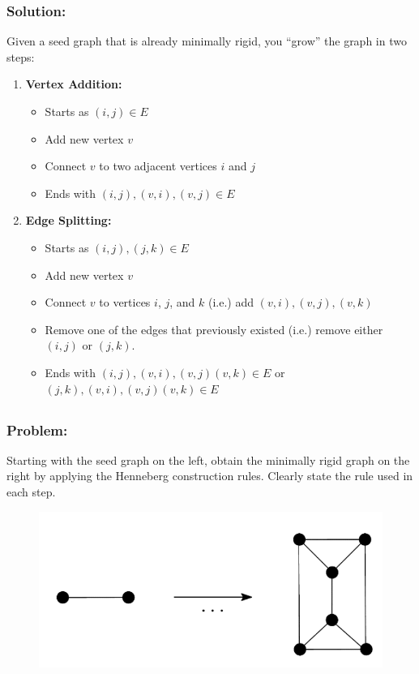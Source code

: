 \documentclass[]{article}
\numberwithin{equation}{section}
\begin{document}
\subsubsection*{Solution:}
Given a seed graph that is already minimally rigid, you ``grow'' the graph in two steps:
\begin{enumerate}
    \item \textbf{Vertex Addition:}
    \begin{itemize}
        \item Starts as $(i,j) \in E$        
        \item Add new vertex $v$
        \item Connect $v$ to two adjacent vertices $i$ and $j$
        \item Ends with $(i,j), (v,i), (v,j) \in E$
    \end{itemize}
    \item \textbf{Edge Splitting:}
    \begin{itemize}
        \item Starts as $(i,j), (j,k) \in E$        
        \item Add new vertex $v$
        \item Connect $v$ to vertices $i$, $j$, and $k$ (i.e.) add $(v,i), (v,j), (v,k)$
        \item Remove one of the edges that previously existed (i.e.) remove either $(i,j)$ or $(j,k)$.
        \item Ends with $(i,j), (v,i), (v,j) (v,k) \in E$ or $(j,k), (v,i), (v,j) (v,k) \in E$
    \end{itemize}
\end{enumerate}

\newpage
\subsection{}
\subsubsection*{Problem:}
Starting with the seed graph on the left, obtain the minimally rigid graph on the right by  applying the Henneberg construction rules. 
Clearly state the rule used in each step. 
\begin{figure}[h]
    \centering
    \includegraphics[width = 0.5 \textwidth]{figs/pblm3b_pblm.png}
\end{figure}
\end{document}
